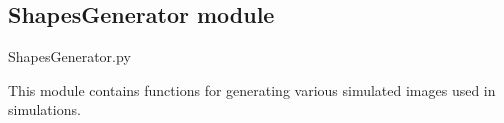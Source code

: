\documentclass[letterpaper,10pt,english]{sphinxmanual}
\begin{document}
\sphinxstepscope


\subsection{ShapesGenerator module}
\label{\detokenize{source/ShapesGenerator:module-ShapesGenerator}}\label{\detokenize{source/ShapesGenerator:shapesgenerator-module}}\label{\detokenize{source/ShapesGenerator::doc}}
\sphinxAtStartPar
ShapesGenerator.py

\sphinxAtStartPar
This module contains functions for generating various simulated images used in simulations.
\end{document}
